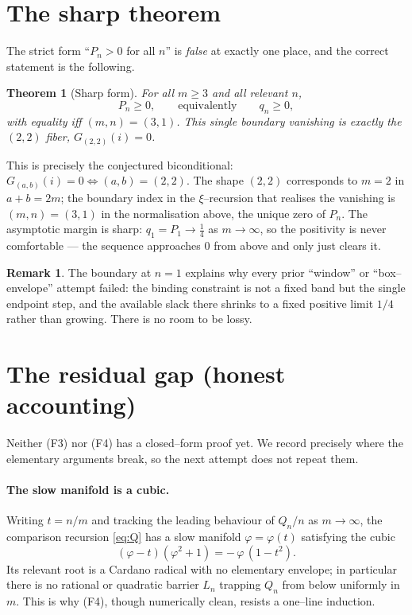 \documentclass[11pt]{article}
\newtheorem{theorem}{Theorem}
\theoremstyle{definition}
\newtheorem{remark}{Remark}
\begin{document}
\section{The sharp theorem}

The strict form ``$P_n>0$ for all $n$'' is \emph{false} at exactly one place,
and the correct statement is the following.

\begin{theorem}[Sharp form]\label{thm:sharp}
For all $m\ge3$ and all relevant $n$,
\[
  P_n\ge0,
  \qquad\text{equivalently}\qquad q_n\ge0,
\]
with equality \emph{iff} $(m,n)=(3,1)$. This single boundary vanishing is exactly
the $(2,2)$ fiber, $G_{(2,2)}(i)=0$.
\end{theorem}

This is precisely the conjectured biconditional: $G_{(a,b)}(i)=0\iff(a,b)=(2,2)$.
The shape $(2,2)$ corresponds to $m=2$ in $a+b=2m$; the boundary index in the
$\xi$--recursion that realises the vanishing is $(m,n)=(3,1)$ in the
normalisation above, the unique zero of $P_n$. The asymptotic margin is sharp:
$q_1=P_1\to\tfrac14$ as $m\to\infty$, so the positivity is never comfortable --- the
sequence approaches $0$ from above and only just clears it.

\begin{remark}
The boundary at $n=1$ explains why every prior ``window'' or ``box--envelope''
attempt failed: the binding constraint is not a fixed band but the single
endpoint step, and the available slack there shrinks to a fixed positive limit
$1/4$ rather than growing. There is no room to be lossy.
\end{remark}

\section{The residual gap (honest accounting)}\label{sec:gap}

Neither (F3) nor (F4) has a closed--form proof yet. We record precisely where
the elementary arguments break, so the next attempt does not repeat them.

\paragraph{The slow manifold is a cubic.}
Writing $t=n/m$ and tracking the leading behaviour of $Q_n/n$ as $m\to\infty$,
the comparison recursion \eqref{eq:Q} has a slow manifold $\varphi=\varphi(t)$
satisfying the cubic
\begin{equation}\label{eq:cubic}
  (\varphi-t)(\varphi^2+1) = -\,\varphi\,(1-t^2).
\end{equation}
Its relevant root is a Cardano radical with no elementary envelope; in
particular there is no rational or quadratic barrier $L_n$ trapping $Q_n$ from
below uniformly in $m$. This is why (F4), though numerically clean, resists a
one--line induction.
\end{document}
